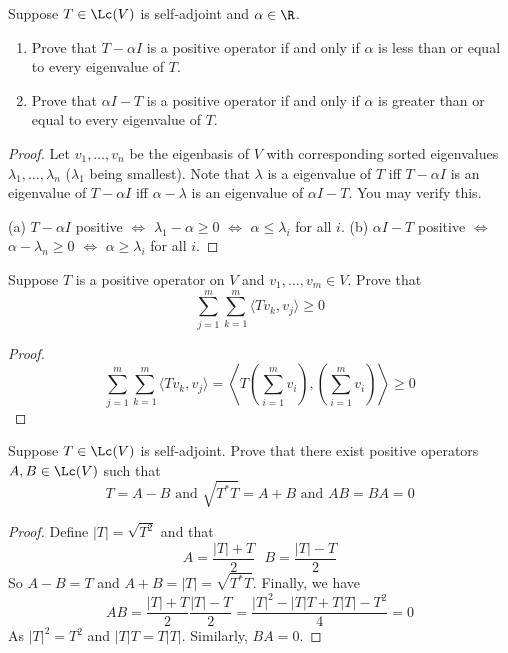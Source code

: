 \documentclass{extarticle}
\begin{document}
\begin{problem}{13}
    Suppose \(T \in \Lc(V)\) is self-adjoint and \(\alpha \in \R\).
    \begin{enumerate}[label=(\alph*)]
        \item Prove that \(T - \alpha I\) is a positive operator if and only if \(\alpha\) is less
        than or equal to every eigenvalue of \(T\).
        \item Prove that \(\alpha I - T\) is a positive operator if and only if \(\alpha\) is
        greater than or equal to every eigenvalue of \(T\).
    \end{enumerate}
\end{problem}

\begin{proof}
Let \(v_1, \ldots, v_n\) be the eigenbasis of \(V\) with corresponding sorted eigenvalues \(\lambda_1,
\ldots, \lambda_n\) (\(\lambda_1\) being smallest). Note that \(\lambda\) is a eigenvalue of \(T\) iff \(T- \alpha I\) is
an eigenvalue of \(T - \alpha I\) iff \(\alpha - \lambda\) is an eigenvalue of \(\alpha I - T\). You
may verify this.

(a) \(T - \alpha I\) positive \(\Longleftrightarrow\) \(\lambda_1 - \alpha \geq 0\)
\(\Longleftrightarrow\) \(\alpha \leq \lambda_i\) for all \(i\).
(b) \(\alpha I  -T\) positive \(\Longleftrightarrow\) \(\alpha - \lambda_n \geq 0\)
\(\Longleftrightarrow\) \(\alpha \geq \lambda_i\) for all \(i\).
\end{proof}

\begin{problem}{14}
    Suppose \(T\) is a positive operator on \(V\) and \(v_1, \ldots, v_m \in V\). Prove that
    \[\sum_{j=1}^{m} \sum_{k=1}^{m} \langle Tv_k,v_j \rangle \geq 0\]
\end{problem}

\begin{proof}
\[\sum_{j=1}^{m} \sum_{k=1}^{m} \langle Tv_k,v_j \rangle
= \left\langle T\left(\sum_{i=1}^{m} v_i \right), \left(\sum_{i=1}^{m} v_i \right) \right\rangle \geq 0\]
\end{proof}

\begin{problem}{15}
    Suppose \(T \in \Lc(V)\) is self-adjoint. Prove that there exist positive operators \(A, B
    \in \Lc(V)\) such that
    \[T = A - B \text{ and } \sqrt{T^* T} = A + B \text{ and } AB = BA = 0\]
\end{problem}

\begin{proof}
Define \(|T| = \sqrt{T^2}\) and that
\[A = \frac{|T| + T}{2} \ \ \ B = \frac{|T| - T}{2}\]
So \(A - B = T\) and \(A+B = |T| = \sqrt{T^* T}\). Finally, we have
\[AB = \frac{|T| + T}{2} \frac{|T| - T}{2} = \frac{|T|^2 - |T|T + T|T| - T^2}{4} = 0\]
As \(|T|^2 = T^2\) and \(|T|T = T|T|\). Similarly, \(BA = 0\).
\end{proof}
\end{document}
